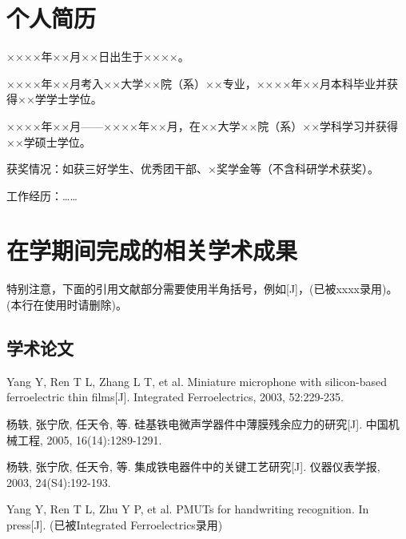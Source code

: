 
\begin{resume}

  \section*{个人简历}

  ××××年××月××日出生于××××。

  ××××年××月考入××大学××院（系）××专业，××××年××月本科毕业并获得××学学士学位。

  ××××年××月——××××年××月，在××大学××院（系）××学科学习并获得××学硕士学位。

  获奖情况：如获三好学生、优秀团干部、×奖学金等（不含科研学术获奖）。

  工作经历：……

  \section*{在学期间完成的相关学术成果}

  特别注意，下面的引用文献部分需要使用半角括号，例如[J]，(已被xxxx录用)。(本行在使用时请删除)。

  \subsection{学术论文}

  \begin{achievements}
    \item Yang Y, Ren T L, Zhang L T, et al. Miniature microphone with silicon-based ferroelectric thin films[J]. Integrated Ferroelectrics, 2003, 52:229-235.
    \item 杨轶, 张宁欣, 任天令, 等. 硅基铁电微声学器件中薄膜残余应力的研究[J]. 中国机械工程, 2005, 16(14):1289-1291.
    \item 杨轶, 张宁欣, 任天令, 等. 集成铁电器件中的关键工艺研究[J]. 仪器仪表学报, 2003, 24(S4):192-193.
    \item Yang Y, Ren T L, Zhu Y P, et al. PMUTs for handwriting recognition. In press[J]. (已被Integrated Ferroelectrics录用)
  \end{achievements}



\end{resume}
